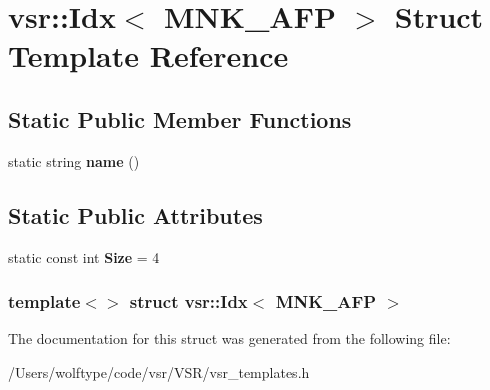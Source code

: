 \hypertarget{structvsr_1_1_idx_3_01_m_n_k___a_f_p_01_4}{\section{vsr\-:\-:Idx$<$ M\-N\-K\-\_\-\-A\-F\-P $>$ Struct Template Reference}
\label{structvsr_1_1_idx_3_01_m_n_k___a_f_p_01_4}
}
\subsection*{Static Public Member Functions}
\begin{DoxyCompactItemize}
\item 
\hypertarget{structvsr_1_1_idx_3_01_m_n_k___a_f_p_01_4_ade7e7fa0048cb1e04b4b63a67d3f7706}{static string {\bfseries name} ()}\label{structvsr_1_1_idx_3_01_m_n_k___a_f_p_01_4_ade7e7fa0048cb1e04b4b63a67d3f7706}

\end{DoxyCompactItemize}
\subsection*{Static Public Attributes}
\begin{DoxyCompactItemize}
\item 
\hypertarget{structvsr_1_1_idx_3_01_m_n_k___a_f_p_01_4_aa98dcc5fd3ce4a9c3371a837a2c8ef51}{static const int {\bfseries Size} = 4}\label{structvsr_1_1_idx_3_01_m_n_k___a_f_p_01_4_aa98dcc5fd3ce4a9c3371a837a2c8ef51}

\end{DoxyCompactItemize}
\subsubsection*{template$<$$>$ struct vsr\-::\-Idx$<$ M\-N\-K\-\_\-\-A\-F\-P $>$}



The documentation for this struct was generated from the following file\-:\begin{DoxyCompactItemize}
\item 
/\-Users/wolftype/code/vsr/\-V\-S\-R/vsr\-\_\-templates.\-h\end{DoxyCompactItemize}
